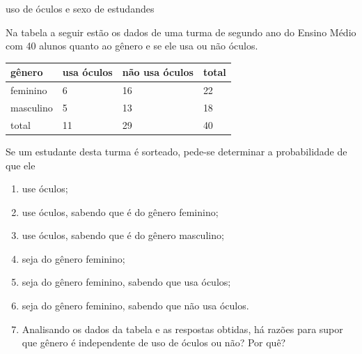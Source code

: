 \begin{task}{uso de óculos e sexo de estudandes}
\label{ativ-uso-de-oculos-e-sexo}

Na tabela a seguir estão os dados de uma turma de segundo ano do Ensino Médio com 40 alunos quanto ao gênero e se ele usa ou não óculos.


\begin{savenotes}\sphinxattablestart
\centering
\begin{tabulary}{\linewidth}[t]{|T|T|T|T|}
\hline

gênero
&
usa óculos
&
não usa óculos
&
total
\\
\hline
feminino
&
6
&
16
&
22
\\
\hline
masculino
&
5
&
13
&
18
\\
\hline
total
&
11
&
29
&
40
\\
\hline
\end{tabulary}
\par
\sphinxattableend\end{savenotes}

Se um estudante desta turma é sorteado, pede-se determinar a probabilidade de que ele
\begin{enumerate}
\item {} 
use óculos;

\item {} 
use óculos, sabendo que é do gênero feminino;

\item {} 
use óculos, sabendo que é do gênero masculino;

\item {} 
seja do gênero feminino;

\item {} 
seja do gênero feminino, sabendo que usa óculos;

\item {} 
seja do gênero feminino, sabendo que não usa óculos.

\item {} 
Analisando os dados da tabela e as respostas obtidas, há razões para supor que gênero é independente de uso de óculos ou não? Por quê?

\end{enumerate}
\end{task}


\label{\detokenize{PE511-7:organizando-probabilidade-condicional}}\label{\detokenize{PE511-7::doc}}

